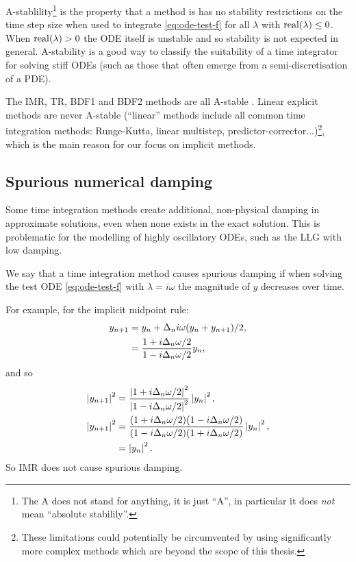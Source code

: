 A-stablility\footnote{The A does not stand for anything, it is just ``A''\cite[40]{HairerWanner}, in particular it does \emph{not} mean ``absolute stabilily''.} is the property that a method is has no stability restrictions on the time step size when used to integrate \eqref{eq:ode-test-f} for all $\lambda$ with $\operatorname{real}(\lambda) \leq 0$.
When $\operatorname{real}(\lambda) > 0$ the ODE itself is unstable and so stability is not expected in general.
A-stability is a good way to classify the suitability of a time integrator for solving stiff ODEs (such as those that often emerge from a semi-discretisation of a PDE).

The IMR, TR, BDF1 and BDF2 methods are all A-stable \cite[pgs. 43, 251]{HairerWanner}.
Linear explicit methods are never A-stable \cite{Nevanlinna1974} (``linear'' methods include all common time integration methods: Runge-Kutta, linear multistep, predictor-corrector...)\footnote{These limitations could potentially be circumvented by using significantly more complex methods which are beyond the scope of this thesis.}, which is the main reason for our focus on implicit methods.


\subsection{Spurious numerical damping}
\label{sec:numerical-damping}

Some time integration methods create additional, non-physical damping in approximate solutions, even when none exists in the exact solution.
This is problematic for the modelling of highly oscillatory ODEs, such as the LLG with low damping.

We say that a time integration method causes spurious damping if when solving the test ODE \eqref{eq:ode-test-f} with $\lambda = i\omega$ the magnitude of $y$ decreases over time.

For example, for the implicit midpoint rule:
\begin{equation}
  \begin{aligned}
    y_{n+1} &= y_n + \Delta_{n} i \omega (y_n + y_{n+1})/2, \\
    &= \frac{1 + i\Delta_{n} \omega/2}{1 - i\Delta_{n} \omega/2} y_n,
  \end{aligned}
\end{equation}
and so
\begin{equation}
  \begin{aligned}
    \left|{y_{n+1}} \right|^2 &=  \frac{\left|{1 + i\Delta_{n} \omega/2} \right|^2}{\left|{1 - i\Delta_{n} \omega/2} \right|^2} \left|{y_n} \right|^2, \\
    \left|{y_{n+1}} \right|^2 &=  \frac{(1 + i\Delta_{n} \omega/2)(1 - i\Delta_{n} \omega/2)}
    {(1 - i\Delta_{n} \omega/2)(1 + i\Delta_{n} \omega/2)} \left|{y_n} \right|^2, \\
    &=  \left|{y_n} \right|^2.
  \end{aligned}
\end{equation}
So IMR does not cause spurious damping.

